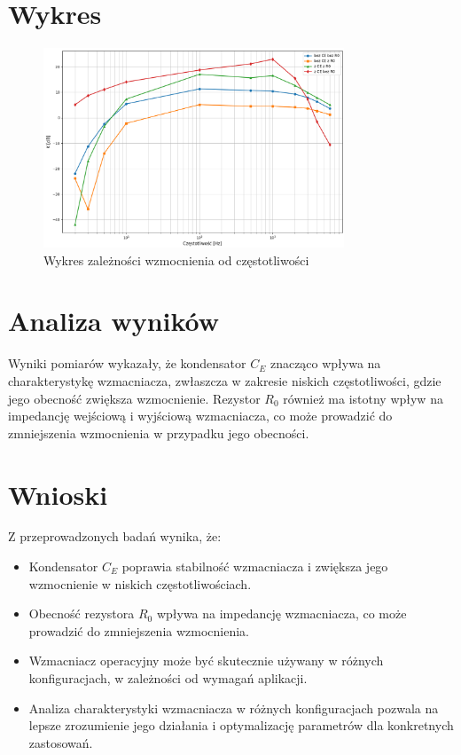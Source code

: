 \documentclass[11pt]{article}
\begin{document}
\clearpage
\section*{Wykres}
\begin{figure}[H]
    \centering
    \includegraphics[width=0.8\textwidth]{wzmacniacz.png}
    \caption{Wykres zależności wzmocnienia od częstotliwości}
    \label{fig:wzmacniacz}
\end{figure}
\section*{Analiza wyników}
Wyniki pomiarów wykazały, że kondensator $C_E$ znacząco wpływa na charakterystykę wzmacniacza,
zwłaszcza w zakresie niskich częstotliwości, gdzie jego obecność zwiększa wzmocnienie.
Rezystor $R_0$ również ma istotny wpływ na impedancję wejściową i wyjściową wzmacniacza,
co może prowadzić do zmniejszenia wzmocnienia w przypadku jego obecności.
\section*{Wnioski}
Z przeprowadzonych badań wynika, że:
\begin{itemize}
    \item Kondensator $C_E$ poprawia stabilność wzmacniacza i zwiększa jego wzmocnienie w niskich częstotliwościach.
    \item Obecność rezystora $R_0$ wpływa na impedancję wzmacniacza, co może prowadzić do zmniejszenia wzmocnienia.
    \item Wzmacniacz operacyjny może być skutecznie używany w różnych konfiguracjach, w zależności od wymagań aplikacji.
    \item Analiza charakterystyki wzmacniacza w różnych konfiguracjach pozwala na lepsze zrozumienie jego działania i optymalizację parametrów dla konkretnych zastosowań.
\end{itemize}
\end{document}

